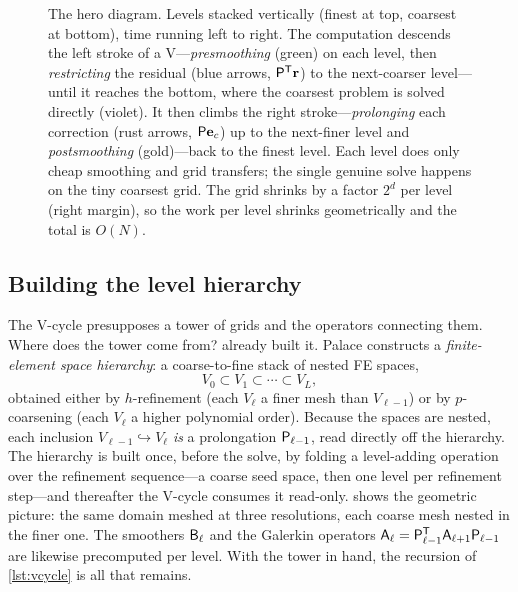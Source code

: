 \begin{figure}[p]
\caption[The V-cycle]{The hero diagram. Levels stacked vertically (finest at top,
coarsest at bottom), time running left to right. The computation descends the left stroke
of a V---\emph{presmoothing} (green) on each level, then \emph{restricting} the residual
(blue arrows, $\mathsf{P}^{\mathsf T}\mathbf{r}$) to the next-coarser level---until it reaches the
bottom, where the coarsest problem is solved directly (violet). It then climbs the right
stroke---\emph{prolonging} each correction (rust arrows, $\mathsf{P}\mathbf{e}_c$) up to the next-finer
level and \emph{postsmoothing} (gold)---back to the finest level. Each level does only cheap
smoothing and grid transfers; the single genuine solve happens on the tiny coarsest grid.
The grid shrinks by a factor $2^d$ per level (right margin), so the work per level shrinks
geometrically and the total is $O(N)$.}
\label{fig:vcycle}
\end{figure}

\subsection{Building the level hierarchy}

The V-cycle presupposes a tower of grids and the operators connecting them. Where does the
tower come from?  already built it. Palace constructs a
\emph{finite-element space hierarchy}: a coarse-to-fine stack of nested FE spaces,
\[
  V_0 \subset V_1 \subset \cdots \subset V_L,
\]
obtained either by $h$-refinement (each $V_{\ell}$ a finer mesh than $V_{\ell-1}$) or by
$p$-coarsening (each $V_{\ell}$ a higher polynomial order). Because the spaces are nested,
each inclusion $V_{\ell-1}\hookrightarrow V_\ell$ \emph{is} a prolongation
$\mathsf{P}_{\ell-1}$, read directly off the hierarchy. The hierarchy is built once, before the
solve, by folding a level-adding operation over the refinement sequence---a coarse seed
space, then one level per refinement step---and thereafter the V-cycle consumes it
read-only.  shows the geometric picture: the same domain meshed at three
resolutions, each coarse mesh nested in the finer one. The smoothers $\mathsf{B}_\ell$ and the
Galerkin operators $\mathsf{A}_\ell = \mathsf{P}_{\ell-1}^{\mathsf T}\mathsf{A}_{\ell+1}\mathsf{P}_{\ell-1}$
are likewise precomputed per level. With the tower in hand, the recursion of
\cref{lst:vcycle} is all that remains.

